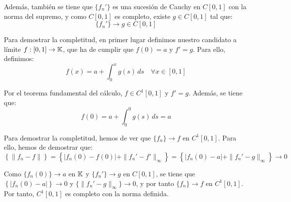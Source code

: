 \begin{ejercicio}
    Además, también se tiene que $\{f_n'\}$ es una sucesión de Cauchy en $C\left[0, 1\right]$ con la norma del supremo, y como $C\left[0, 1\right]$ es completo, existe $g \in C\left[0, 1\right]$ tal que:
    \begin{equation*}
        \{f_n'\} \longrightarrow g \in C\left[0, 1\right]
    \end{equation*}

    Para demostrar la completitud, en primer lugar definimos nuestro candidato a límite $f:\left[0, 1\right] \to \mathbb{K}$, que ha de cumplir que $f(0) = a$ y $f' = g$. Para ello, definimos:
    \begin{equation*}
        f(x) = a + \int_{0}^x g(s)\,ds \quad \forall x \in \left[0, 1\right]
    \end{equation*}

    Por el teorema fundamental del cálculo, $f\in C^1\left[0, 1\right]$ y $f' = g$. Además, se tiene que:
    \begin{equation*}
        f(0) = a + \int_{0}^0 g(s)\,ds = a
    \end{equation*}

    Para demostrar la completitud, hemos de ver que $\{f_n\} \to f$ en $C^1\left[0, 1\right]$. Para ello, hemos de demostrar que:
    \begin{equation*}
        \left\{\|f_n - f\|\right\} = \left\{|f_n(0) - f(0)| + \|f_n' - f'\|_\infty\right\} = \left\{|f_n(0) - a| + \|f_n' - g\|_\infty\right\} \longrightarrow 0
    \end{equation*}

    Como $\{f_n(0)\} \to a$ en $\mathbb{K}$ y $\{f_n'\} \to g$ en $C\left[0, 1\right]$, se tiene que $\left\{|f_n(0)-a|\right\} \to 0$ y $\{\|f_n' - g\|_\infty\} \to 0$, y por tanto $\{f_n\} \to f$ en $C^1\left[0, 1\right]$. Por tanto, $C^1\left[0, 1\right]$ es completo con la norma definida.
\end{ejercicio}

